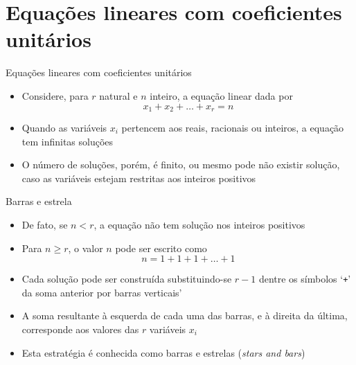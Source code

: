 \section{Equações lineares com coeficientes unitários}

\begin{frame}[fragile]{Equações lineares com coeficientes unitários}

    \begin{itemize}
        \item Considere, para $r$ natural e $n$ inteiro, a equação linear dada por
$$
        x_1 + x_2 + \ldots + x_r = n
$$

        \item Quando as variáveis $x_i$ pertencem aos reais, racionais ou inteiros, a equação tem infinitas soluções

        \item O número de soluções, porém, é finito, ou mesmo pode não existir solução, caso as
            variáveis estejam restritas aos inteiros positivos
    \end{itemize}

\end{frame}

\begin{frame}[fragile]{Barras e estrela}

    \begin{itemize}
        \item De fato, se $n < r$, a equação não tem solução nos inteiros positivos

        \item Para $n \geq r$, o valor $n$ pode ser escrito como
$$
        n = 1 + 1 + 1 + \ldots + 1
$$

        \item Cada solução pode ser construída substituindo-se $r - 1$ dentre os símbolos
            `\texttt{+}' da soma anterior por barras verticais'

        \item A soma resultante à esquerda de cada uma das barras, e à direita da última,
            corresponde aos valores das $r$ variáveis $x_i$

        \item Esta estratégia é conhecida como barras e estrelas (\textit{stars and bars})
    \end{itemize}

\end{frame}

